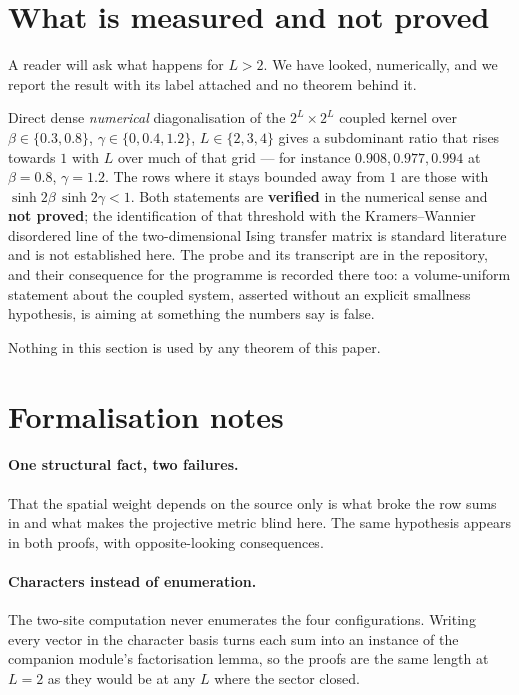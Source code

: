 \documentclass[11pt]{article}
\theoremstyle{definition}
\begin{document}
\section{What is measured and not proved}\label{sec:measured}

A reader will ask what happens for $L>2$.  We have looked, numerically, and we
report the result with its label attached and no theorem behind it.

Direct dense \emph{numerical} diagonalisation of the $2^L\times2^L$ coupled
kernel over
$\beta\in\{0.3,0.8\}$, $\gamma\in\{0,0.4,1.2\}$, $L\in\{2,3,4\}$ gives a
subdominant ratio that rises towards $1$ with $L$ over much of that grid --- for
instance $0.908, 0.977, 0.994$ at $\beta=0.8$, $\gamma=1.2$.  The rows where it
stays bounded away from $1$ are those with $\sinh 2\beta\,\sinh 2\gamma<1$.
Both statements are \textbf{verified} in the numerical sense and \textbf{not
proved}; the identification of that threshold with the Kramers--Wannier
disordered line of the two-dimensional Ising transfer matrix is standard
literature and is not established here.  The probe and its transcript are in the
repository, and their consequence for the programme is recorded there too: a
volume-uniform statement about the coupled system, asserted without an explicit
smallness hypothesis, is aiming at something the numbers say is false.

Nothing in this section is used by any theorem of this paper.

\section{Formalisation notes}

\paragraph{One structural fact, two failures.}  That the spatial weight depends
on the source only is what broke the row sums in \cite{ErikssonSpatial} and what
makes the projective metric blind here.  The same hypothesis appears in both
proofs, with opposite-looking consequences.

\paragraph{Characters instead of enumeration.}  The two-site computation never
enumerates the four configurations.  Writing every vector in the character basis
turns each sum into an instance of the companion module's factorisation lemma,
so the proofs are the same length at $L=2$ as they would be at any $L$ where the
sector closed.
\end{document}
